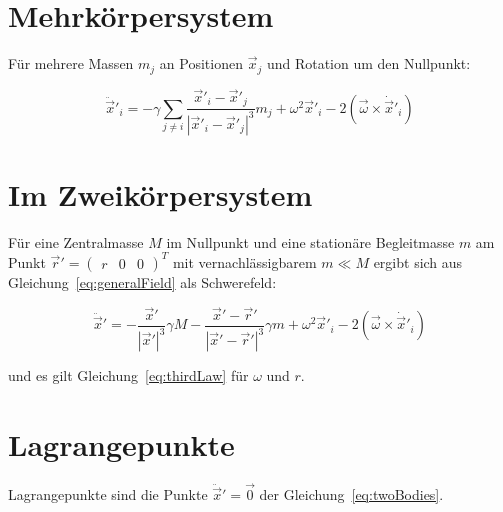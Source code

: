 \documentclass[12pt]{article}
\begin{document}
\section{Mehrkörpersystem}

Für mehrere Massen $m_j$ an Positionen $\vec{x}_j$ und Rotation um den Nullpunkt:

\begin{equation}
\ddot{\vec{x}}'_i = - \gamma \sum_{j \neq i} \frac{\vec{x}'_i-\vec{x}'_j}{\left| \vec{x}'_i-\vec{x}'_j \right|^3} m_j + \omega^2\vec{x}'_i - 2 \left( \vec{\omega} \times \dot{\vec{x}}'_i\right) \label{eq:generalField}
\end{equation}

\section{Im Zweikörpersystem}

Für eine Zentralmasse $M$ im Nullpunkt und eine stationäre Begleitmasse $m$ am Punkt $\vec{r}' = \left( \begin{matrix} r & 0 & 0 \end{matrix} \right)^T$ mit vernachlässigbarem $m \ll M$ ergibt sich aus Gleichung~\ref{eq:generalField} als Schwerefeld:

\begin{equation}
\ddot{\vec{x}}' = - \frac{\vec{x}'}{\left| \vec{x}' \right|^3} \gamma M - \frac{\vec{x}'-\vec{r}'}{\left| \vec{x}' - \vec{r}' \right|^3} \gamma m + \omega^2\vec{x}'_i - 2 \left( \vec{\omega} \times \dot{\vec{x}}'_i\right)
\label{eq:twoBodies}
\end{equation}

\noindent und es gilt Gleichung~\ref{eq:thirdLaw} für $\omega$ und $r$.

\section{Lagrangepunkte}

Lagrangepunkte sind die Punkte $\ddot{\vec{x}}' = \vec{0}$ der Gleichung~\ref{eq:twoBodies}.
\end{document}
